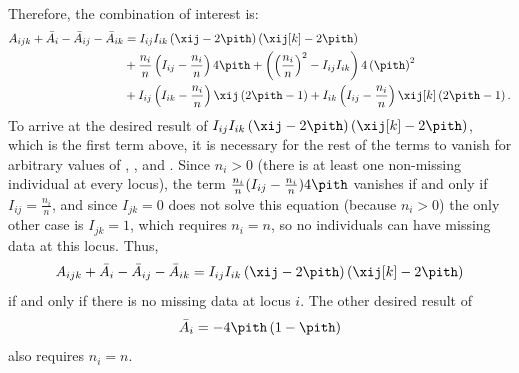 \documentclass[11pt]{article}
\begin{document}
\begin{appendices}
\begin{align*}
  \end{align*}
  Therefore, the combination of interest is:
  \begin{align*}
    A_{ijk} + \bar{A}_i - \bar{A}_{ij}  - \bar{A}_{ik}
    &=
      I_{ij} I_{ik} \left( \xij - 2 \pith \right) \left( \xij[k] - 2 \pith \right)
    \\
      &+ \frac{n_i}{n} \left( I_{ij} - \frac{n_i}{n} \right) 4 \pith
        + \left( \left( \frac{n_i}{n} \right)^2 -  I_{ij} I_{ik} \right) 4 \left( \pith \right)^2
    \\
      &+ I_{ij} \left( I_{ik} - \frac{n_i}{n} \right) \xij \left( 2 \pith - 1 \right)
      + I_{ik} \left( I_{ij} - \frac{n_i}{n} \right) \xij[k] \left( 2 \pith - 1 \right)
      .
  \end{align*}
  To arrive at the desired result of $I_{ij} I_{ik} \left( \xij - 2 \pith \right) \left( \xij[k] - 2 \pith \right)$, which is the first term above, it is necessary for the rest of the terms to vanish for arbitrary values of \pith, \xij, and \xij[k].
  Since $n_i > 0$ (there is at least one non-missing individual at every locus), the term $\frac{n_i}{n} ( I_{ij} - \frac{n_i}{n} ) 4 \pith$ vanishes if and only if $I_{ij} = \frac{n_i}{n}$, and since $I_{jk}=0$ does not solve this equation (because $n_i > 0$) the only other case is $I_{jk}=1$, which requires $n_i=n$, so no individuals can have missing data at this locus.
  Thus,
  $$
  A_{ijk} + \bar{A}_i - \bar{A}_{ij}  - \bar{A}_{ik}
  =
  I_{ij} I_{ik} \left( \xij - 2 \pith \right) \left( \xij[k] - 2 \pith \right)
  $$
  if and only if there is no missing data at locus $i$.
  The other desired result of
  $$
  \bar{A}_i
  =
  - 4 \pith \left( 1 - \pith \right)
  $$
  also requires $n_i = n$.


\end{appendices}
\end{document}
